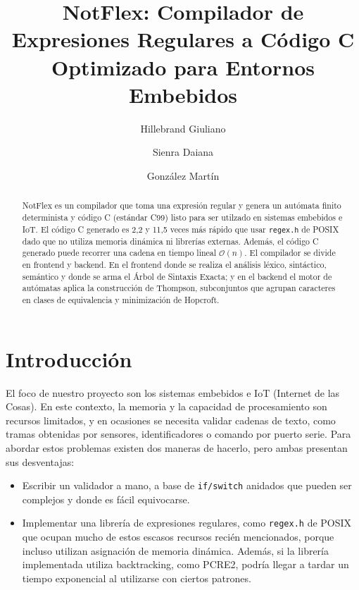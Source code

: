 \documentclass[runningheads]{llncs}
\begin{document}
\title{NotFlex: Compilador de Expresiones Regulares a Código C Optimizado para Entornos Embebidos}

\author{Hillebrand Giuliano \and Sienra Daiana \and González Martín}



\maketitle

\begin{abstract}
NotFlex es  un compilador que toma una expresión regular y genera un autómata finito determinista y código C (estándar C99) listo para ser utilzado en sistemas embebidos e IoT. El código C generado es 2,2 y 11,5 veces más rápido que usar \texttt{regex.h} de POSIX dado que no utiliza memoria dinámica ni librerías externas. Además, el código C generado puede recorrer una cadena en tiempo lineal $\mathcal{O}(n)$. El compilador se divide en frontend y backend. En el frontend donde se realiza el análisis léxico, sintáctico, semántico y donde se arma el Árbol de Sintaxis Exacta; y en el backend el motor de autómatas aplica la construcción de Thompson, subconjuntos que agrupan caracteres en clases de equivalencia y minimización de Hopcroft.

\end{abstract}

\section{Introducción}
El foco de nuestro proyecto son los sistemas embebidos e IoT (Internet de las Cosas). En este contexto, la memoria y la capacidad de procesamiento son recursos limitados, y en ocasiones se necesita validar cadenas de texto, como tramas obtenidas por sensores, identificadores o comando por puerto serie. Para abordar estos problemas existen dos maneras de hacerlo, pero ambas presentan sus desventajas:
\begin{itemize}
    \item Escribir un validador a mano, a base de \texttt{if/switch} anidados que pueden ser complejos y donde es fácil equivocarse.
    \item Implementar una librería de expresiones regulares, como \texttt{regex.h} de POSIX que ocupan mucho de estos escasos recursos recién mencionados, porque incluso utilizan asignación de memoria dinámica. Además, si la librería implementada utiliza backtracking, como PCRE2, podría llegar a tardar un tiempo exponencial al utilizarse con ciertos patrones.
\end{itemize}
\end{document}
